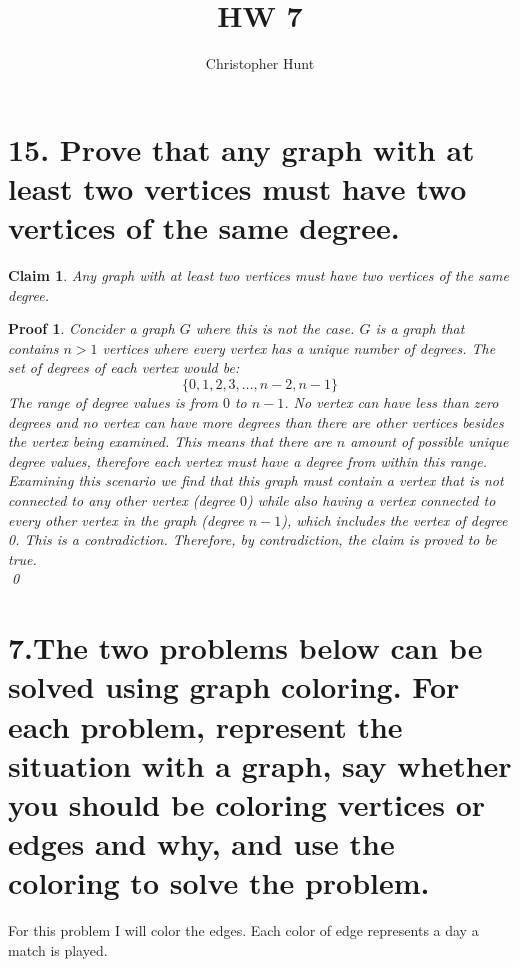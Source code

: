 \documentclass{article}
\title{HW 7}
\author{Christopher Hunt}
\date{}
\newtheorem*{claim}{Claim}
\newtheorem*{poof}{Proof}
\begin{document}
\pagestyle{fancy}
\fancyhf{}
\rhead{\thepage}
\maketitle

\section*{15. Prove that any graph with at least two vertices must have two vertices of the same degree.}
\begin{claim}
    Any graph with at least two vertices must have two vertices of the same degree.
\end{claim}
\begin{poof}
    Concider a graph $G$ where this is not the case. $G$ is a graph that contains $n > 1$ vertices where every vertex has a unique number of degrees. The set of degrees of each vertex would be:
    \[\{0,1,2,3,\ldots,n-2,n-1\}\]
    The range of degree values is from $0$ to $n-1$. No vertex can have less than zero degrees and no vertex can have more degrees than there are other vertices besides the vertex being examined. This means that there are $n$ amount of possible unique degree values, therefore each vertex must have a degree from within this range. Examining this scenario we find that this graph must contain a vertex that is not connected to any other vertex (degree $0$) while also having a vertex connected to every other vertex in the graph (degree $n-1$), which includes the vertex of degree 0. This is a contradiction. Therefore, by contradiction, the claim is proved to be true.\\
    \qed\end{poof}

\newpage
\section*{7.The two problems below can be solved using graph coloring. For each problem, represent the situation with a graph, say whether you should be coloring vertices or edges and why, and use the coloring to solve the problem.}
For this problem I will color the edges. Each color of edge represents a day a match is played.
\end{document}
